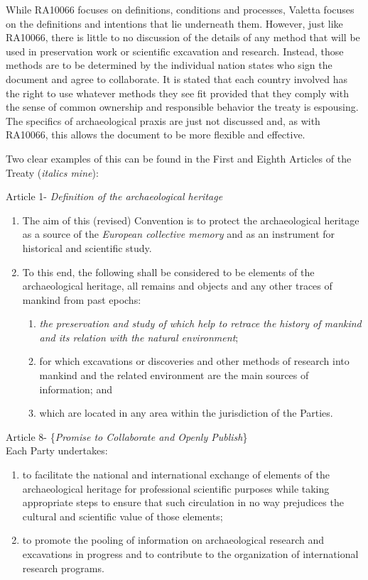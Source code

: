 While RA10066 focuses on definitions, conditions and processes, Valetta focuses on the definitions and intentions that lie underneath them. However, just like RA10066, there is little to no discussion of the details of any method that will be used in preservation work or scientific excavation and research. Instead, those methods are to be determined by the individual nation states who sign the document and agree to collaborate. It is stated that each country involved has the right to use whatever methods they see fit provided that they comply with the sense of common ownership and responsible behavior the treaty is espousing. The specifics of archaeological praxis are just not discussed and, as with RA10066, this allows the document to be more flexible and effective. 

Two clear examples of this can be found in the First and Eighth Articles of the Treaty (\textit{italics mine}): 

\begin{displayquote}
	Article 1- \textit{Definition of the archaeological heritage}
	\begin{enumerate}
		\item The aim of this (revised) Convention is to protect the archaeological heritage as a source of the \textit{European collective memory} and as an instrument for historical and scientific study.
		\item To this end, {the following} shall be considered to be elements of the archaeological heritage, all remains and objects and any other traces of mankind from past epochs:
		\begin{enumerate}
			\item \textit{the preservation and study of which help to retrace the history of mankind and its relation with the natural environment};
			\item for which excavations or discoveries and other methods of research into mankind and the related environment are the main sources of information; and
			\item which are located in any area within the jurisdiction of the Parties. \parencite[2]{Valetta_1992}
		\end{enumerate}
	\end{enumerate}
	Article 8- \{\textit{Promise to Collaborate and Openly Publish}\}\\
	Each Party undertakes:
	\begin{enumerate}
		\item to facilitate the national and international exchange of elements of the archaeological heritage for professional scientific purposes while taking appropriate steps to ensure that such circulation in no way prejudices the cultural and scientific value of those elements;
		\item to promote the pooling of information on archaeological research and excavations in progress and to contribute to the organization of international research programs. \parencite[4]{Valetta_1992}
	\end{enumerate}
\end{displayquote}

